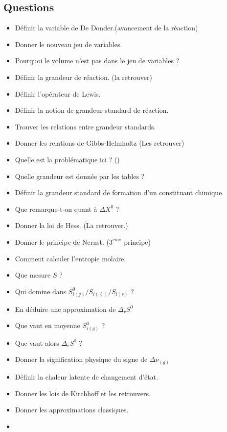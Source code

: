 \documentclass[a4paper, 11pt, hidelinks]{article}
\newcommand{\rb}[1]{\Romanbar{#1}}
\begin{document}
\subsection{Questions}



\begin{itemize}
    \item Définir la variable de De Donder.(avancement de la réaction) \cite{Chapitre2bis}
    \item Donner le nouveau jeu de variables. \cite{Chapitre2bis}
    \item Pourquoi le volume n'est pas dans le jeu de variables ? \cite{Chapitre2bis}
    \item Définir la grandeur de réaction. (la retrouver) \cite{Chapitre2bis}
    \item Définir l'opérateur de Lewis. \cite{Chapitre2bis}
    \item Définir la notion de grandeur standard de réaction. \cite{Chapitre2bis}
    \item Trouver les relations entre grandeur standards. \cite{Chapitre2bis}
    \item Donner les relations de Gibbs-Helmholtz (Les retrouver) \cite{Chapitre2bis}
    \item Quelle est la problématique ici ? (\rb{2}) \cite{Chapitre2bis}
    \item Quelle grandeur est donnée par les tables ? \cite{Chapitre2bis}
    \item Définir la grandeur standard de formation d'un constituant chimique. \cite{Chapitre2bis}
    \item Que remarque-t-on quant à $\Delta X^0$ ? \cite{Chapitre2bis}
    \item Donner la loi de Hess. (La retrouver.) \cite{Chapitre2bis}
    \item Donner le principe de Nernst. ($3^{eme}$ principe) \cite{Chapitre2bis}
    \item Comment calculer l'entropie molaire. \cite{Chapitre2bis}
    \item Que mesure $S$ ? \cite{Chapitre2bis}
    \item Qui domine dans $S_{i(g)}^0 / S_{i(\ell)} / S_{i(s)}$ ? \cite{Chapitre2bis}
    \item En déduire une approximation de $\Delta_r S^0$ \cite{Chapitre2bis}
    \item Que vaut en moyenne $S_{i(g)}^0$ ? \cite{Chapitre2bis}
    \item Que vaut alors $\Delta_r S^0$ ? \cite{Chapitre2bis}
    \item Donner la signification physique du signe de $\Delta \nu_{(g)}$ \cite{Chapitre2bis}
    \item Définir la chaleur latente de changement d'état. \cite{Chapitre2bis}
    \item Donner les lois de Kirchhoff et les retrouvers. \cite{Chapitre2bis}
    \item Donner les approximations classiques. \cite{Chapitre2bis}
    \item 
\end{itemize}
\end{document}
